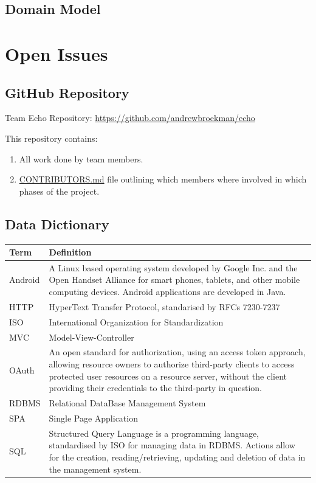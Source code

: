 \documentclass[a4paper,10pt]{article}
\begin{document}
\subsection{Domain Model}

\section{Open Issues}
\subsection {GitHub Repository}
Team Echo Repository: \url{https://github.com/andrewbroekman/echo}

This repository contains:
\begin{enumerate}
\item All work done by team members.
\item \href{https://github.com/andrewbroekman/echo/blob/master/CONTRIBUTORS.md}{CONTRIBUTORS.md} file outlining which members where involved in which phases of the project.
\end{enumerate}

\begin{appendices}
\newpage
\section{Data Dictionary}
\begin{tabu} to \textwidth { | X[l] | X[l] | }
	\hline
		\textbf{Term}		& \textbf{Definition}	\\ \hline \hline
		Android			&  A Linux based operating system developed by Google Inc. and the Open Handset Alliance for smart phones, tablets, and other mobile computing devices. Android applications are developed in Java. \\ \hline
		HTTP			& HyperText Transfer Protocol, standarised by RFCs 7230-7237 \\ \hline
		ISO				& International Organization for Standardization \\ \hline
		MVC				& Model-View-Controller \\ \hline
		OAuth			& An open standard for authorization, using an access token approach, allowing resource owners to authorize third-party clients to access protected user resources on a resource server, without the client providing their credentials to the third-party in question. \\ \hline
		RDBMS			& Relational DataBase Management System \\ \hline
		SPA				& Single Page Application \\ \hline
		SQL				& Structured Query Language is a programming language, standardised by ISO for managing data in RDBMS. Actions allow for the creation, reading/retrieving, updating and deletion of data in the management system. \\ \hline
	\hline
\end{tabu}

\end{appendices}

\newpage
\clearpage
{}
\printbibliography
\end{document}
